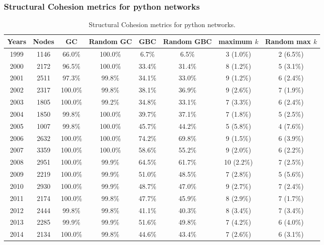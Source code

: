 \documentclass[ignorenonframetext,red,8pt,notes=hide]{beamer}
\begin{document}
\begin{frame}
\frametitle{Structural Cohesion metrics for python networks}
\begin{table}[H]
\begin{center}
\begin{footnotesize}
\begin{tabular}{|c|c|c|c|c|c|c|c|}
\hline
Years&Nodes&GC&Random GC&GBC&Random GBC&maximum $k$&Random max $k$\\
\hline
1999&1146&66.0\%&100.0\%&6.7\%&6.5\%&3 (1.0\%)&2 (6.5\%)\\
2000&2172&96.5\%&100.0\%&33.4\%&31.4\%&8 (1.2\%)&5 (3.1\%)\\
2001&2511&97.3\%&99.8\%&34.1\%&33.0\%&9 (1.2\%)&6 (2.4\%)\\
2002&2317&100.0\%&99.8\%&38.1\%&36.9\%&9 (2.6\%)&7 (1.9\%)\\
2003&1805&100.0\%&99.2\%&34.8\%&33.1\%&7 (3.3\%)&6 (2.4\%)\\
2004&1850&99.8\%&100.0\%&39.7\%&37.1\%&7 (1.8\%)&5 (2.5\%)\\
2005&1007&99.8\%&100.0\%&45.7\%&44.2\%&5 (5.8\%)&4 (7.6\%)\\
2006&2632&100.0\%&100.0\%&74.2\%&69.8\%&9 (1.5\%)&6 (3.9\%)\\
2007&3359&100.0\%&100.0\%&58.6\%&55.2\%&9 (2.0\%)&6 (2.2\%)\\
2008&2951&100.0\%&99.9\%&64.5\%&61.7\%&10 (2.2\%)&7 (2.5\%)\\
2009&2219&100.0\%&99.9\%&51.0\%&48.5\%&7 (2.8\%)&5 (5.6\%)\\
2010&2930&100.0\%&99.9\%&48.7\%&47.0\%&9 (2.7\%)&7 (2.4\%)\\
2011&2174&100.0\%&99.8\%&47.7\%&45.9\%&8 (2.9\%)&7 (1.7\%)\\
2012&2444&99.8\%&99.8\%&41.1\%&40.3\%&8 (3.4\%)&7 (3.4\%)\\
2013&2285&99.9\%&99.9\%&51.6\%&49.8\%&7 (4.2\%)&6 (4.0\%)\\
2014&2134&100.0\%&99.8\%&44.6\%&43.4\%&7 (2.6\%)&6 (3.1\%)\\
\hline
\end{tabular}
\caption{Structural Cohesion metrics for python networks.}
\label{str_cohesion_python}
\end{footnotesize}
\end{center}
\end{table}


\end{frame}
\end{document}
